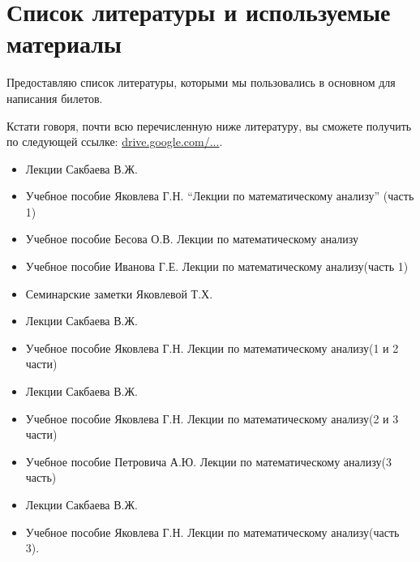 \chapter{Список литературы и используемые материалы}

Предоставляю список литературы, которыми мы пользовались в основном для написания билетов. 

Кстати говоря, почти всю перечисленную ниже литературу, вы сможете получить по следующей ссылке: \href{https://drive.google.com/drive/u/0/folders/0BzuzEyNkpwYDcENXcV9jNWdwVlU}{drive.google.com/...}.


\begin{itemize}[wide,  labelwidth=!, noitemsep, label=$\blacktriangleright$, labelindent = 0pt]
\item
Лекции Сакбаева В.Ж.
\item
Учебное пособие Яковлева Г.Н. ``Лекции по математическому анализу'' (часть 1)
\item
Учебное пособие Бесова О.В. \glqq Лекции по математическому анализу\grqq
\item
Учебное пособие Иванова Г.Е. \glqq Лекции по математическому анализу\grqq (часть 1)
\item
Семинарские заметки Яковлевой Т.Х.
\end{itemize}

\begin{itemize}[wide,  labelwidth=!, noitemsep, label=$\blacktriangleright$, labelindent = 0pt]
\item
Лекции Сакбаева В.Ж.
\item
Учебное пособие Яковлева Г.Н. \glqq Лекции по математическому анализу\grqq (1 и 2 части)
\end{itemize}

\begin{itemize}[wide,  labelwidth=!, noitemsep, label=$\blacktriangleright$, labelindent = 0pt]
\item
Лекции Сакбаева В.Ж.
\item
Учебное пособие Яковлева Г.Н. \glqq Лекции по математическому анализу\grqq (2 и 3 части)
\item
Учебное пособие Петровича А.Ю. \glqq Лекции по математическому анализу\grqq (3 часть)
\end{itemize}

\begin{itemize}[wide,  labelwidth=!, noitemsep, label=$\blacktriangleright$, labelindent = 0pt]
\item
Лекции Сакбаева В.Ж.
\item
Учебное пособие Яковлева Г.Н. \glqq Лекции по математическому анализу\grqq  (часть 3).
\end{itemize}


